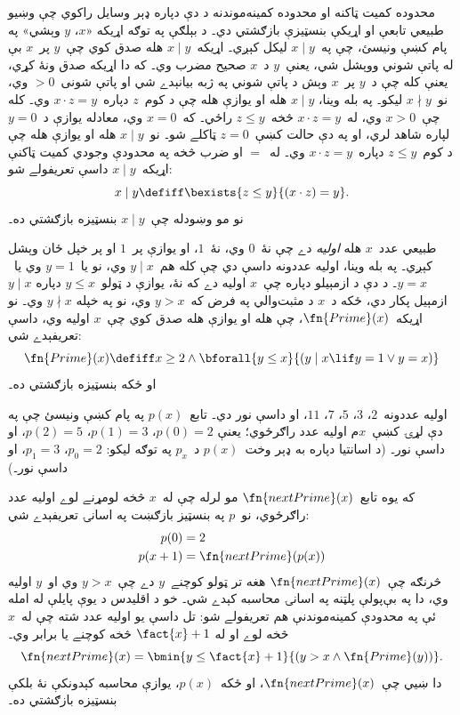 \documentclass[../../../include/open-logic-section]{subfiles}
\begin{document}

محدوده کميت ټاکنه او محدوده کمينه‌موندنه د دې دپاره ډېر وسايل راکوي چې وښيو طبيعي تابعې او اړيکې بنسټيزې بازګشتي دي۔ د بېلګې په توګه اړيکه «$x$، $y$ وېشي» په پام کښې ونيسئ، چې په~$x \mid y$ ليکل کېږي۔ اړيکه~$x \mid y$ هله صدق کوي چې~$y$ پر~$x$ بې له پاتې شوني ووېشل شي، يعنې~$y$ د~$x$ صحيح مضرب وي۔ که دا اړيکه صدق ونۀ کړي، يعنې کله چې د~$y$ پر~$x$ وېش د پاتې شوني په ژبه بيانېدے شي او پاتې شونی~$> 0$ وي، نو~$x \nmid y$ ليکو۔ په بله وينا، $x \mid y$ هله او يوازې هله چې د کوم~$z$ دپاره~$x \cdot z = y$ وي۔ کله چې~$x>0$ وي، له~$x \cdot z = y$ څخه~$z \leq y$ راځي۔ که~$x=0$ وي، معادله يوازې د~$y=0$ لپاره شاهد لري، او په دې حالت کښې~$z=0$ ټاکلے شو۔ نو~$x \mid y$ هله او يوازې هله چې د کوم~$z \le y$ دپاره~$x \cdot z = y$ وي۔ له~$=$ او ضرب څخه په محدودې وجودي کميت ټاکنې اړيکه~$x \mid y$ داسې تعريفولے شو:
\[
x \mid y \defiff \bexists{z \leq y}{(x \cdot z) = y}.
\]
نو مو وښودله چې~$x \mid y$ بنسټيزه بازګشتي ده۔

طبيعي عدد~$x$ هله
\emph{اوليه} دے چې نۀ~$0$ وي، نۀ~$1$، او يوازې پر~$1$ او پر خپل ځان وېشل کېږي۔ په بله وينا، اوليه عددونه داسې دي چې کله هم~$y \mid x$ وي، نو يا~$y = 1$ وي يا~$y=x$۔ د دې د ازمېيلو دپاره چې~$x$ اوليه دے که نۀ، يوازې د ټولو~$y \le x$ دپاره $y \mid x$ ازمېيل پکار دي، ځکه د~$x$ د مثبت‌والي په فرض که~$y > x$ وي، نو په خپله $y \nmid x$ وي۔ نو اړيکه~$\fn{Prime}(x)$، چې هله او يوازې هله صدق کوي چې~$x$ اوليه وي، داسې تعريفېدے شي:
\[
\fn{Prime}(x) \defiff x \geq 2 \land \bforall{y \leq x}{(y \mid x \lif y = 1 \lor y = x)}
\]
او ځکه بنسټيزه بازګشتي ده۔

اوليه عددونه~$2$، $3$، $5$، $7$، $11$، او داسې نور دي۔ تابع~$p(x)$ په پام کښې ونيسئ چې په دې لړۍ کښې~$x$م اوليه عدد راګرځوي؛ يعنې $p(0) = 2$، $p(1) = 3$، $p(2) = 5$، او داسې نور۔ (د اسانتيا دپاره به ډېر وخت~$p(x)$ د~$p_x$ په توګه ليکو: $p_0=2$، $p_1=3$، او داسې نور۔)

که يوه تابع~$\fn{nextPrime}(x)$ مو لرله چې له~$x$ څخه لومړنے لوے اوليه عدد راګرځوي، نو~$p$ په بنسټيز بازګښت په اسانۍ تعريفېدے شي:
\begin{align*}
  p(0) & = 2\\
  p(x+1) & = \fn{nextPrime}(p(x))
\end{align*}
څرنګه چې~$\fn{nextPrime}(x)$ هغه تر ټولو کوچنے~$y$ دے چې~$y > x$ وي او~$y$ اوليه وي، دا په بې‌پولې پلټنه په اسانۍ محاسبه کېدے شي۔ خو د اقليدس د يوې پايلې له امله ئې په محدودې کمينه‌موندنې هم تعريفولے شو: تل داسې يو اوليه عدد شته چې له~$x$ څخه لوے او له $\fact{x}+1$ څخه کوچنے يا برابر وي۔
\[
  \fn{nextPrime}(x) =
  \bmin{y \leq \fact{x}+1}{(y > x \land \fn{Prime}(y))}.
\]
دا ښيي چې~$\fn{nextPrime}(x)$، او ځکه~$p(x)$، يوازې محاسبه کېدونکې نۀ بلکې بنسټيزه بازګشتي ده۔
\end{document}
